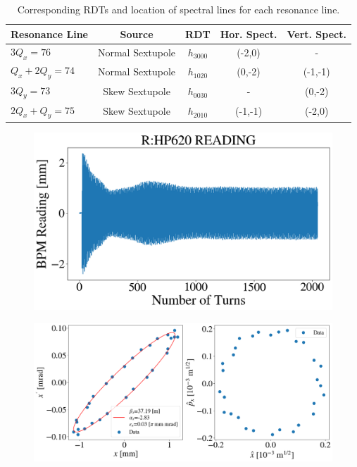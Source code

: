 \begin{table}[H]
    \centering
    \caption{Corresponding RDTs and location of spectral lines for each resonance line.}
    \begin{tabular}{lcccc}
        \toprule
        \textbf{Resonance Line} & \textbf{Source} & \textbf{RDT} & \textbf{Hor. Spect.} & \textbf{Vert. Spect.} \\
        \midrule
            $3Q_x=76$     & Normal Sextupole    & $h_{3000}$           &  (-2,0)  & -       \\ %
           $Q_x+2Q_y=74$   & Normal Sextupole    & $h_{1020}$            & (0,-2) & (-1,-1)       \\ %
            $3Q_y=73$     & Skew Sextupole   & $h_{0030}$           & - & (0,-2)        \\ %
            $2Q_x+Q_y=75$   & Skew Sextupole    & $h_{2010}$     & (-1,-1) & (-2,0)       \\
        \bottomrule
    \end{tabular}
    \label{tab:rdtlines}
\end{table}

\begin{figure}[H]
    \centering
    \includegraphics[width=\columnwidth]{chapter4/bpm_kick.png}
    \caption{}
    \label{fig:bpm_kick0}
\end{figure}

\begin{figure}[H]
    \centering
    \includegraphics[width=\columnwidth]{chapter4/ellipse_data.png}
    \caption{}
    \label{fig:ellipse}
\end{figure}

